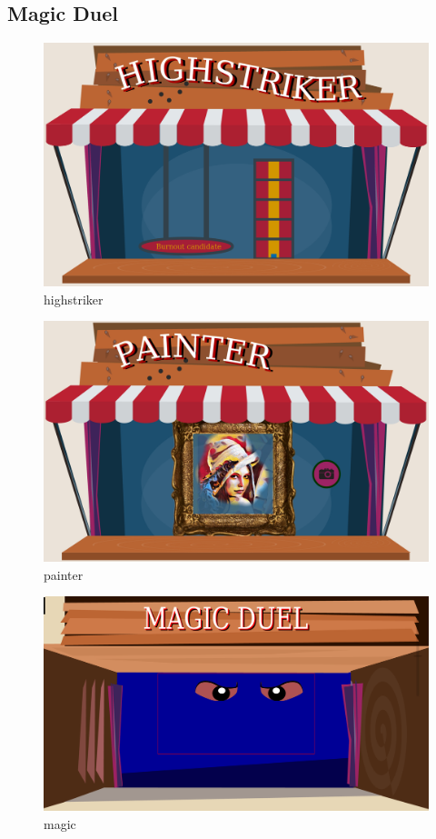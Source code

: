 \documentclass{utue} %
\begin{document}
\subsection{Magic Duel}


\begin{figure}[]
	\centering
	\includegraphics[width=1.0\columnwidth]{images/highstriker.png}
	\caption{highstriker}
	\label{fig:highstriker}
\end{figure}
\begin{figure}[]
	\centering
	\includegraphics[width=1.0\columnwidth]{images/painter.png}
	\caption{painter}
	\label{fig:painter}
\end{figure}
\begin{figure}[]
	\centering
	\includegraphics[width=1.0\columnwidth]{images/magic.png}
	\caption{magic}
	\label{fig:magic}
\end{figure}
\end{document}
